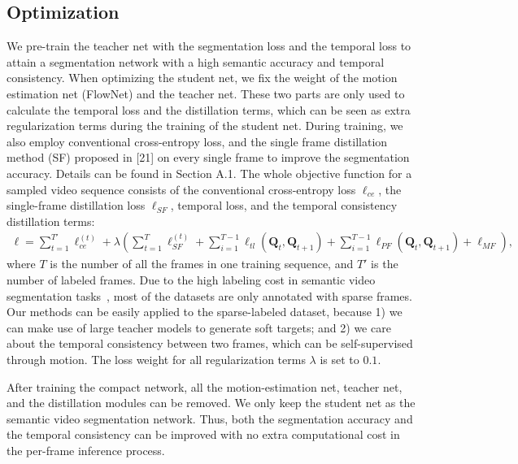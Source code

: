 \documentclass[runningheads]{llncs}
\begin{document}
\subsection{Optimization}
\label{sec:svsn}
We pre-train the teacher net with the segmentation loss and the temporal loss to
attain
a segmentation network with a high semantic accuracy and temporal consistency. When optimizing the student net, we fix the weight of the motion estimation net (FlowNet) and the teacher net. These two parts are only used to calculate the temporal loss and the distillation
terms, which can be seen as extra regularization
terms
during the training of the student net. During training, we also employ conventional cross-entropy loss, and the single frame distillation method (SF) proposed in [21] on every single frame to improve the segmentation accuracy. Details can be found in Section A.1. The whole objective function for a sampled video sequence consists of the conventional cross-entropy loss $\ell_{ce}$, the single-frame distillation loss $\ell_{SF}$, temporal loss, and the temporal consistency distillation
terms:
\begin{equation}
\begin{aligned}
        \ell=\sum_{t=1}^{T'}\ell_{ce}^{(t)}+\lambda (\sum_{t=1}^{T}\ell_{SF}^{(t)}+\sum_{i=1}^{T-1}\ell_{tl}(\mathbf{Q}_t,\mathbf{Q}_{t+1})
        +\sum_{i=1}^{T-1}\ell_{PF}(\mathbf{Q}_t,\mathbf{Q}_{t+1})+\ell_{MF}),
\end{aligned}
\end{equation}
\noindent where $T$ is the number of all the frames in one training sequence, and $T'$ is the number of labeled frames. Due to the high labeling cost in semantic video segmentation tasks~\cite{Cordts2016Cityscapes,brostow2008segmentation}, most of the datasets are only annotated with sparse frames. Our methods can be easily applied to the sparse-labeled dataset, because 1) we can make use of large teacher models to generate soft targets; and 2) we care about the temporal consistency between two frames, which can be self-supervised through motion. The loss weight for all regularization
terms
$\lambda$ is set to $0.1$.

After training the compact network, all the motion-estimation net, teacher net, and the distillation modules can be removed. We only keep the student net as the semantic video segmentation network. Thus, both the segmentation accuracy and the temporal consistency can be improved with no extra computational cost in the per-frame inference process.
\end{document}
